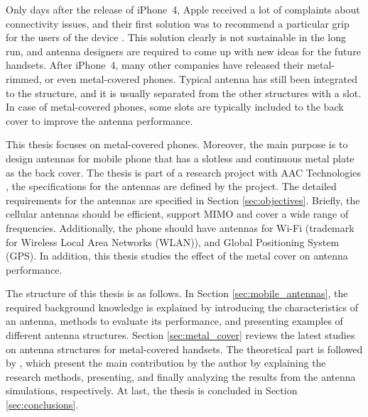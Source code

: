 Only days after the release of iPhone~4, Apple received a lot of complaints about connectivity issues, and their first solution was to recommend a particular grip for the users of the device \cite{apple_press,apple_bbc}. This solution clearly is not sustainable in the long run, and antenna designers are required to come up with new ideas for the future handsets. After iPhone~4, many other companies have released their metal-rimmed, or even metal-covered phones. Typical antenna has still been integrated to the structure, and it is usually separated from the other structures with a slot. In case of metal-covered phones, some slots are typically included to the back cover to improve the antenna performance. 

This thesis focuses on metal-covered phones. Moreover, the main purpose is to design antennas for mobile phone that has a slotless and continuous metal plate as the back cover. The thesis is part of a research project with AAC Technologies \cite{aac}, the specifications for the antennas are defined by the project. The detailed requirements for the antennas are specified in Section \ref{sec:objectives}. Briefly, the cellular antennas should be efficient, support MIMO and cover a wide range of frequencies. Additionally, the phone should have antennas for Wi-Fi (trademark for Wireless Local Area Networks (WLAN)), and Global Positioning System (GPS). In addition, this thesis studies the effect of the metal cover on antenna performance.

The structure of this thesis is as follows. In Section \ref{sec:mobile_antennas}, the required background knowledge is explained by introducing the characteristics of an antenna, methods to evaluate its performance, and presenting examples of different antenna structures. Section \ref{sec:metal_cover} reviews the latest studies on antenna structures for metal-covered handsets. The theoretical part is followed by , which present the main contribution by the author by explaining the research methods, presenting, and finally analyzing the results from the antenna simulations, respectively. At last, the thesis is concluded in Section \ref{sec:conclusions}.

\clearpage
